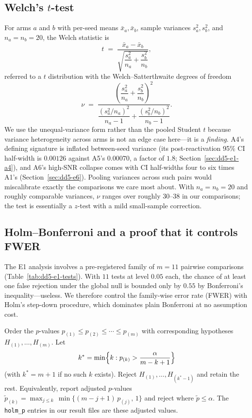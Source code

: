 \subsection{Welch's $t$-test}
\label{sec:dd5-welch}

For arms $a$ and $b$ with per-seed means $\bar{x}_a, \bar{x}_b$, sample
variances $s_a^2, s_b^2$, and $n_a = n_b = 20$, the Welch statistic is
\begin{equation}
t \;=\; \frac{\bar{x}_a - \bar{x}_b}
{\sqrt{\dfrac{s_a^2}{n_a} + \dfrac{s_b^2}{n_b}}},
\label{eq:dd5-welch-t}
\end{equation}
referred to a $t$ distribution with the Welch--Satterthwaite degrees of
freedom
\begin{equation}
\nu \;=\;
\frac{\left(\dfrac{s_a^2}{n_a} + \dfrac{s_b^2}{n_b}\right)^{2}}
{\dfrac{(s_a^2/n_a)^2}{n_a - 1} + \dfrac{(s_b^2/n_b)^2}{n_b - 1}}.
\label{eq:dd5-welch-df}
\end{equation}
We use the unequal-variance form rather than the pooled Student $t$ because
variance heterogeneity across arms is not an edge case here---it is a
\emph{finding}. A4's defining signature is inflated between-seed variance
(its post-reactivation 95\% CI half-width is $0.00126$ against A5's
$0.00070$, a factor of $1.8$; Section~\ref{sec:dd5-e1-a4}), and A6's
high-SNR collapse comes with CI half-widths four to six times A1's
(Section~\ref{sec:dd5-e6}). Pooling variances across such pairs would
miscalibrate exactly the comparisons we care most about. With $n_a=n_b=20$
and roughly comparable variances, $\nu$ ranges over roughly $30$--$38$ in our
comparisons; the test is essentially a $z$-test with a mild small-sample
correction.

\subsection{Holm--Bonferroni and a proof that it controls FWER}
\label{sec:dd5-holm}

The E1 analysis involves a pre-registered family of $m = 11$ pairwise
comparisons (Table~\ref{tab:dd5-e1-tests}). With $11$ tests at level $0.05$
each, the chance of at least one false rejection under the global null is
bounded only by $0.55$ by Bonferroni's inequality---useless. We therefore
control the family-wise error rate (FWER) with Holm's step-down procedure,
which dominates plain Bonferroni at no assumption cost.

\begin{definition}
\label{def:dd5-holm}
Order the $p$-values $p_{(1)} \le p_{(2)} \le \cdots \le p_{(m)}$ with
corresponding hypotheses $H_{(1)},\dots,H_{(m)}$. Let
\[
k^\ast = \min\Bigl\{ k : p_{(k)} > \frac{\alpha}{m - k + 1} \Bigr\}
\]
(with $k^\ast = m+1$ if no such $k$ exists). Reject
$H_{(1)},\dots,H_{(k^\ast - 1)}$ and retain the rest. Equivalently, report
adjusted $p$-values
$\tilde{p}_{(k)} = \max_{j \le k}\, \min\{(m-j+1)\, p_{(j)},\, 1\}$
and reject where $\tilde{p} \le \alpha$. The \texttt{holm\_p} entries in our
result files are these adjusted values.
\end{definition}

